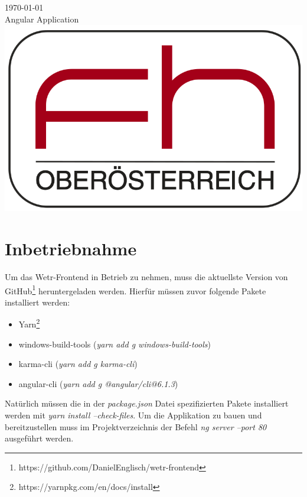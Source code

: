 \documentclass[12pt, letterpaper]{article}
\begin{document}
\begin{titlepage}
{\large \today}\\[1cm] 
{Angular Application}\\[2cm]


\includegraphics[scale=0.15]{img/logo.png}
 

\vfill 
\end{titlepage}


\tableofcontents
\newpage

\setlength\parindent{0pt}


\section{Inbetriebnahme}

Um das Wetr-Frontend in Betrieb zu nehmen, muss die aktuellste Version von GitHub\footnote{https://github.com/DanielEnglisch/wetr-frontend} heruntergeladen werden. Hierfür müssen zuvor folgende Pakete installiert werden:
\begin{itemize}
    \item Yarn\footnote{https://yarnpkg.com/en/docs/install}
    \item windows-build-tools (\textit{yarn add g windows-build-tools})
    \item karma-cli (\textit{yarn add g karma-cli})
    \item angular-cli (\textit{yarn add g @angular/cli@6.1.3})
\end{itemize}

Natürlich müssen die in der \textit{package.json} Datei spezifizierten Pakete installiert werden mit \textit{yarn install --check-files}.  Um die Applikation zu bauen und bereitzustellen muss im Projektverzeichnis der Befehl \textit{ng server --port 80} ausgeführt werden.\\
\end{document}
